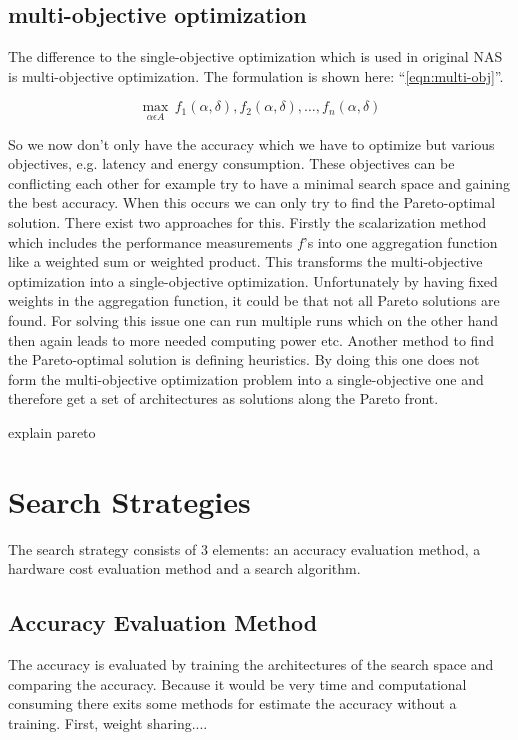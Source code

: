 \documentclass[conference]{IEEEtran}
\begin{document}
\subsection{multi-objective optimization}
The difference to the single-objective optimization which is used in original NAS is multi-objective optimization. The formulation is shown here: ``\eqref{eqn:multi-obj}''.
 
\begin{equation}
\label{eqn:multi-obj}
\max_{\alpha\epsilon A}\,f_{1}(\alpha, \delta),f_{2}(\alpha, \delta),\ldots ,f_{n}(\alpha, \delta)
\end{equation}     

So we now don't only have the accuracy which we have to optimize but various objectives, e.g. latency and energy consumption. These objectives can be conflicting each other for example try to have a minimal search space and gaining the best accuracy. When this occurs we can only try to find the Pareto-optimal solution. There exist two approaches for this. Firstly the scalarization method which includes the performance measurements $f$'s into one aggregation function like a weighted sum or weighted product. This transforms the multi-objective optimization into a single-objective optimization. Unfortunately by having fixed weights in the aggregation function, it could be that not all Pareto solutions are found. For solving this issue one can run multiple runs which on the other hand then again leads to more needed computing power etc. Another method to find the Pareto-optimal solution is defining heuristics. By doing this one does not form the multi-objective optimization problem into a single-objective one and therefore get a set of architectures as solutions along the Pareto front. 

explain pareto

\section{Search Strategies}
The search strategy consists of 3 elements: an accuracy evaluation method, a hardware cost evaluation method and a search algorithm. 

\subsection{Accuracy Evaluation Method}
The accuracy is evaluated by training the architectures of the search space and comparing the accuracy. Because it would be very time and computational consuming there exits some methods for estimate the accuracy without a training. First, weight sharing....
\end{document}
